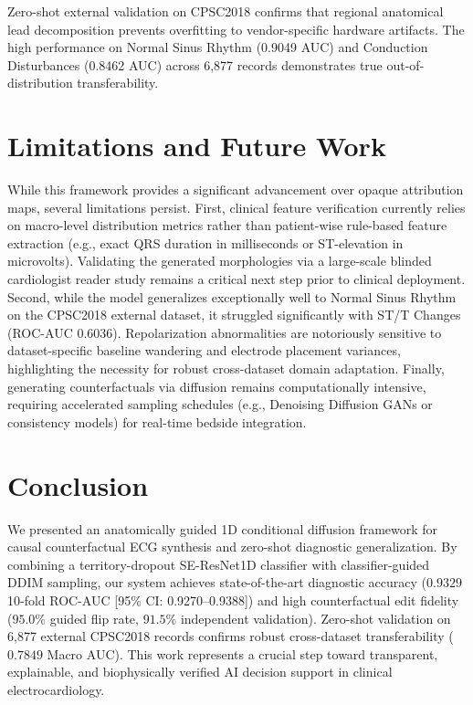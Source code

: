 \documentclass[5p,twocolumn,10pt]{elsarticle}
\begin{document}
Zero-shot external validation on CPSC2018 confirms that regional anatomical lead decomposition prevents overfitting to vendor-specific hardware artifacts. The high performance on Normal Sinus Rhythm (0.9049 AUC) and Conduction Disturbances (0.8462 AUC) across 6,877 records demonstrates true out-of-distribution transferability.

\section{Limitations and Future Work}
\label{sec:limitations}
While this framework provides a significant advancement over opaque attribution maps, several limitations persist. First, clinical feature verification currently relies on macro-level distribution metrics rather than patient-wise rule-based feature extraction (e.g., exact QRS duration in milliseconds or ST-elevation in microvolts). Validating the generated morphologies via a large-scale blinded cardiologist reader study remains a critical next step prior to clinical deployment. Second, while the model generalizes exceptionally well to Normal Sinus Rhythm on the CPSC2018 external dataset, it struggled significantly with ST/T Changes (ROC-AUC 0.6036). Repolarization abnormalities are notoriously sensitive to dataset-specific baseline wandering and electrode placement variances, highlighting the necessity for robust cross-dataset domain adaptation. Finally, generating counterfactuals via diffusion remains computationally intensive, requiring accelerated sampling schedules (e.g., Denoising Diffusion GANs or consistency models) for real-time bedside integration.

\section{Conclusion}
\label{sec:conclusion}
We presented an anatomically guided 1D conditional diffusion framework for causal counterfactual ECG synthesis and zero-shot diagnostic generalization. By combining a territory-dropout SE-ResNet1D classifier with classifier-guided DDIM sampling, our system achieves state-of-the-art diagnostic accuracy ($0.9329$ 10-fold ROC-AUC [95\% CI: 0.9270--0.9388]) and high counterfactual edit fidelity ($95.0\%$ guided flip rate, $91.5\%$ independent validation). Zero-shot validation on 6,877 external CPSC2018 records confirms robust cross-dataset transferability ($0.7849$ Macro AUC). This work represents a crucial step toward transparent, explainable, and biophysically verified AI decision support in clinical electrocardiology.
\end{document}
